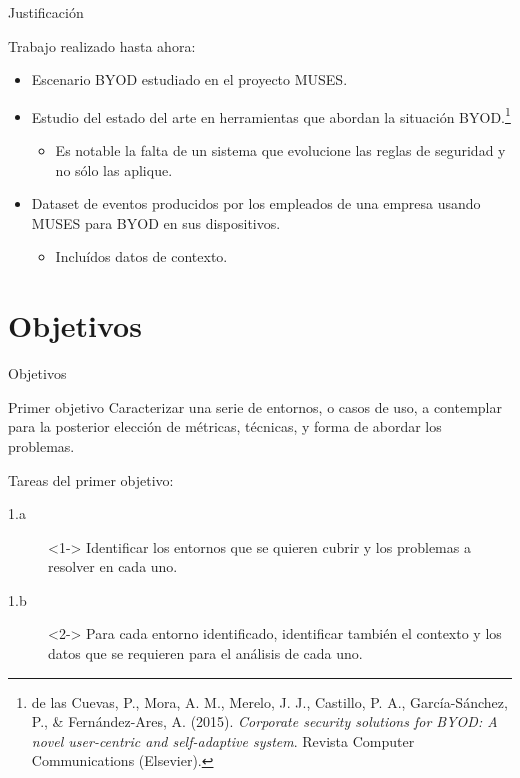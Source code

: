 \documentclass{beamer}
\begin{document}
\begin{frame}{Justificación}

Trabajo realizado hasta ahora:

\begin{itemize}
  \item<1-> Escenario BYOD estudiado en el proyecto MUSES.
  \item<2-> Estudio del estado del arte en herramientas que abordan la situación BYOD.\footnote{{\scriptsize de las Cuevas, P., Mora, A. M., Merelo, J. J., Castillo, P. A., García-Sánchez, P., \& Fernández-Ares, A. (2015). \textit{Corporate security solutions for BYOD: A novel user-centric and self-adaptive system}. Revista Computer Communications (Elsevier).}}
  \begin{itemize}
    \item<3-> Es notable la falta de un sistema que evolucione las reglas de seguridad y no sólo las aplique.
  \end{itemize}
  \item<4-> Dataset de eventos producidos por los empleados de una empresa usando MUSES para BYOD en sus dispositivos.
  \begin{itemize}
    \item<5-> Incluídos datos de contexto.
  \end{itemize}
\end{itemize}

\end{frame}


\section{Objetivos}

\begin{frame}{Objetivos}

\begin{block}{Primer objetivo}
Caracterizar una serie de entornos, o casos de uso, a contemplar para la posterior elección de métricas, técnicas, y forma de abordar los problemas.
\end{block}

Tareas del primer objetivo:

\begin{description}
  \item[1.a]<1-> Identificar los entornos que se quieren cubrir y los problemas a resolver en cada uno.
  \item[1.b]<2-> Para cada entorno identificado, identificar también el contexto y los datos que se requieren para el análisis de cada uno.
\end{description}

\end{frame}
\end{document}
